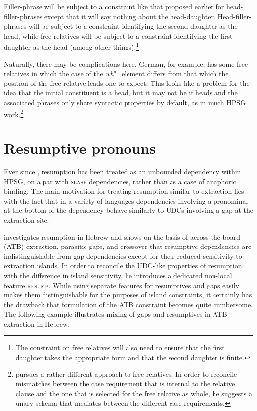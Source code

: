 \documentclass[output=paper
                ,modfonts
                ,nonflat
	        ,collection
	        ,collectionchapter
	        ,collectiontoclongg
 	        ,biblatex
                ,babelshorthands
                ,newtxmath
                ,draftmode
                ,colorlinks, citecolor=brown
]{./langsci/langscibook}
\begin{document}
{\begin{figure}[htb]
\end{figure}

\noindent
Filler-phrase will be subject to a constraint like that proposed earlier
for head-filler-phrases except that it will say nothing about the
head-daughter. Head-filler-phrases will be subject to a constraint
identifying the second daughter as the head, while free-relatives will
be subject to a constraint identifying the first daughter as the head
(among other things).\footnote{The constraint on free relatives will also
  need to ensure that the first daughter takes the appropriate form and
  that the second daughter is finite.}

Naturally, there may be complications here. German, for example, has
some free relatives in which the case of the \emph{wh}"=element differs from
that which the position of the free relative leads one to expect. This
looks like a problem for the idea that the initial constituent is a
head, but it may not be if heads and the associated phrases only share
syntactic properties by default, as in much HPSG
work.\footnote{\citet{Mueller:99a} pursues a rather different approach
  to free relatives: In order to reconcile 
mismatches between the case requirement that is internal to the relative
clause and the one that is selected for the free relative as whole,
he suggests a unary schema that mediates between the
different case requirements.  }


\section{Resumptive pronouns}
\label{sec:UDC:ResumptivePronouns}

Ever since \citet{Vaillette:01}, resumption has been treated as an unbounded dependency within HPSG, on a par with \textsc{slash} dependencies, rather than as a case of anaphoric binding. The main motivation for treating resumption similar to extraction lies with the fact that in a variety of languages dependencies involving a pronominal at the bottom of the dependency behave similarly to UDCs involving a gap at the extraction site. 

\citet{Vaillette:01} investigates resumption in Hebrew and shows on
the basis of across-the-board (ATB) extraction, parasitic gaps, and
crossover that resumptive dependencies are indistinguishable from gap
dependencies except for their reduced sensitivity to extraction
islands. In order to reconcile the UDC-like properties of resumption
with the difference in island sensitivity, he introduces a dedicated
non-local feature \textsc{resump}. While using separate features for
resumptives and gaps easily makes them distinguishable for the
purposes of island constraints, it certainly has the drawback that
formulation of the ATB constraint becomes quite cumbersome.
The following example illustrates mixing of gaps and resumptives in
ATB extraction in Hebrew: 

}
\end{document}
